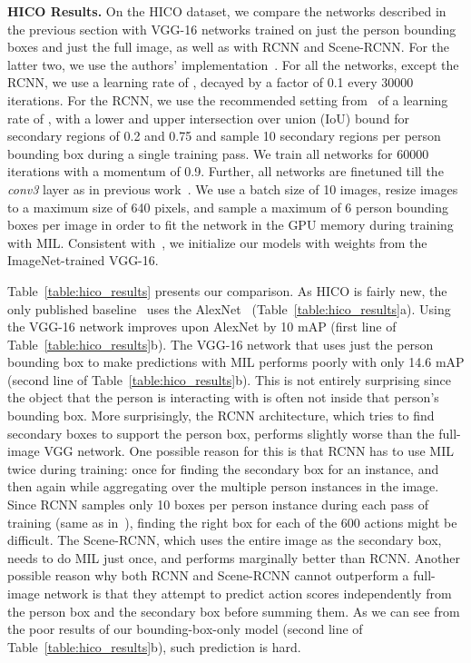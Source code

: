 \documentclass[runningheads]{llncs}
\begin{document}
{\bf HICO Results.} On the HICO dataset, we compare the networks described in the previous section with VGG-16 networks trained on just the person bounding boxes and just the full image, as well as with RCNN and Scene-RCNN. For the latter two, we use the authors' implementation~\cite{gkioxari2015rstarcnn}. For all the networks, except the RCNN, we use a learning rate of , decayed by a factor of 0.1 every 30000 iterations. For the RCNN, we use the recommended setting from~\cite{gkioxari2015rstarcnn} of a learning rate of , with a lower and upper intersection over union (IoU) bound for secondary regions of 0.2 and 0.75 and sample 10 secondary regions per person bounding box during a single training pass. We train all networks for 60000 iterations with a momentum of 0.9. Further, all networks are finetuned till the \emph{conv3} layer as in previous work~\cite{gkioxari2015rstarcnn,girshick2015fast}. We use a batch size of 10 images, resize images to a maximum size of 640 pixels, and sample a maximum of 6 person bounding boxes per image in order to fit the network in the GPU memory during training with MIL. Consistent with~\cite{girshick2014rich,agrawal2014analyzing,bell2015InsideOutside}, we initialize our models with weights from the ImageNet-trained VGG-16. 

Table~\ref{table:hico_results} presents our comparison. As HICO is fairly new, the only published baseline~\cite{chao2015hico} uses the AlexNet~\cite{alexnet} (Table~\ref{table:hico_results}a). Using the VGG-16 network improves upon AlexNet by 10 mAP (first line of Table~\ref{table:hico_results}b). The VGG-16 network that uses just the person bounding box to make predictions with MIL performs poorly with only 14.6 mAP (second line of Table~\ref{table:hico_results}b). This is not entirely surprising since the object that the person is interacting with is often not inside that person's bounding box.
More surprisingly, the RCNN architecture, which tries to find secondary boxes to support the person box, performs slightly worse than the full-image VGG network. One possible reason for this is that RCNN has to use MIL twice during training: once for finding the secondary box for an instance, and then again while aggregating over the multiple person instances in the image. Since RCNN samples only 10 boxes per person instance during each pass of training (same as in~\cite{gkioxari2015rstarcnn}), finding the right box for each of the 600 actions might be difficult. The Scene-RCNN, which uses the entire image as the secondary box, needs to do MIL just once, and performs marginally better than RCNN. Another possible reason why both RCNN and Scene-RCNN cannot outperform a full-image network is that they attempt to predict action scores independently from the person box and the secondary box before summing them. As we can see from the poor results of our bounding-box-only model (second line of Table~\ref{table:hico_results}b), such prediction is hard.
\end{document}
